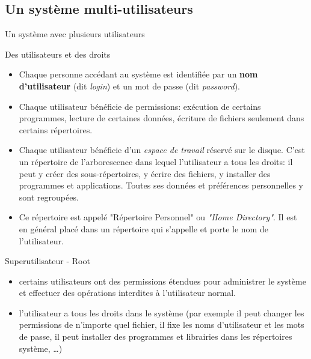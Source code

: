 \subsection{Un système multi-utilisateurs}
\begin{frame}{Un système avec plusieurs utilisateurs}
  \begin{block}{Des utilisateurs et des droits}
    \begin{itemize}
    \item Chaque personne accédant au système est identifiée par un
      \textbf{nom d'utilisateur} (dit \textit{login}) et un mot de passe
      (dit \textit{password}).
    \item Chaque utilisateur bénéficie de permissions: exécution de
      certains programmes, lecture de certaines données, écriture de
      fichiers seulement dans certains répertoires.
    \item Chaque utilisateur bénéficie d'un \emph{espace de travail}
      réservé sur le disque. C'est un répertoire de l'arborescence dans
      lequel l'utilisateur a tous les droits: il peut y créer des
      sous-répertoires, y écrire des fichiers, y installer des
      programmes et applications. Toutes ses données et préférences
      personnelles y sont regroupées.
    \item Ce répertoire est appelé "Répertoire Personnel" ou
      \textit{"Home Directory"}. Il est en général placé dans un
      répertoire qui s'appelle  et porte le nom de
      l'utilisateur.
    \end{itemize}
  \end{block}
  \begin{alertblock}{Superutilisateur - Root}
    \begin{itemize}
    \item certains utilisateurs ont des permissions étendues pour
      administrer le système et effectuer des opérations interdites à
      l'utilisateur normal.
    \item l'utilisateur  a tous les droits dans le système
      (par exemple il peut changer les permissions de n'importe quel
      fichier, il fixe les noms d'utilisateur et les mots de passe, il
      peut installer des programmes et librairies dans les répertoires
      système, \dots)
    \end{itemize}
  \end{alertblock}
\end{frame}

